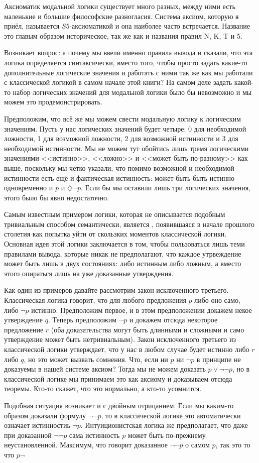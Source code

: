 Аксиоматик модальной логики существует много разных, между ними есть маленькие и большие философские разногласия. Система аксиом, которую я приёл, называется $S5$-аксиоматикой и она наиболее часто встречается. Название это главым образом историческое, так же как и названия правил N, K, T и 5.

Возникает вопрос: а почему мы ввели именно правила вывода и сказали, что эта логика определяется синтаксически, вместо того, чтобы просто задать какие-то дополнительные логические значения и работать с ними так же как мы работали с классической логикой в самом начале этой книги? На самом деле задать какой-то набор логических значений для модальной логики было бы невозможно и мы можем это продемонстрировать.

Предположим, что всё же мы можем свести модальную логику к логическим значениям. Пусть у нас логических значений будет четыре: 0 для необходимой ложности, 1 для возможной ложности, 2 для возможной истинности и 3 для необходимой истинности. Мы не можем тут обойтись лишь тремя логическими значениями <<истинно>>, <<ложно>> и <<может быть по-разному>> как выше, поскольку мы четко указали, что помимо возможной и необходимой истинности есть ещё и фактическая истинность: может быть быть истинно одновременно и $p$ и $\diamondsuit\neg p$. Если бы мы оставили лишь три логических значения, этого было бы явно недостаточно.



Самым известным примером логики, которая не описывается подобным тривиальным способом семантически, является , появившаяся в начале прошлого столетия как попытка уйти от скользких моментов классической логики. Основная идея этой логики заключается в том, чтобы пользоваться лишь теми правилами вывода, которые никак не предполагают, что каждое утрвеждение может быть лишь в двух состояниях: либо истинным либо ложным, а вместо этого опираться лишь на уже доказанные утверждения.

Как один из примеров давайте рассмотрим закон исключенного третьего. Классическая логика говорит, что для любого предложения $p$ либо оно само, либо $\neg p$ истинно. Предположим первое, и в этом предположении докажем некое утверждение $q$. Теперь предположим $\neg p$ и докажем отсюда некоторое предложение $r$ (оба доказательства могут быть длинными и сложными и само утверждение может быть нетривиальным). Закон исключенного третьего из классической логики утверждает, что у нас в любом случае будет истинно либо $r$ либо $q$, но это может вызвать сомнения. Что, если ни $p$ ни $\neg p$ в принципе не доказуемы в нашей системе аксиом? Тогда мы не можем доказать $p \lor \neg \neg p$, но в классической логике мы принимаем это как аксиому и доказываем отсюда теоремы. Кто-то скажет, что это нормально, а кто-то усомнится.

Подобная ситуация возникает и с двойным отрицанием. Если мы каким-то образом доказали формулу $\neg\neg p$, то в классической логике это автоматически означает истинностиь $\neg p$. Интуиционистская логика же предполагает, что даже при доказанной $\neg\neg p$ сама истинность $p$ может быть по-прежнему неустановленной. Максимум, что говорит доказанное $\neg\neg p$ о самом $p$, так это то что $p\neg$
